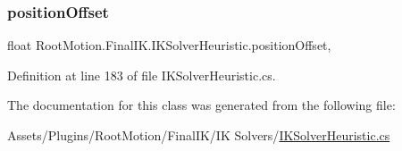 \subsubsection{\texorpdfstring{position\+Offset}{positionOffset}}
{\footnotesize\ttfamily float Root\+Motion.\+Final\+I\+K.\+I\+K\+Solver\+Heuristic.\+position\+Offset\hspace{0.3cm}{\ttfamily [get]}, {\ttfamily [protected]}}



Definition at line 183 of file I\+K\+Solver\+Heuristic.\+cs.



The documentation for this class was generated from the following file\+:\begin{DoxyCompactItemize}
\item 
Assets/\+Plugins/\+Root\+Motion/\+Final\+I\+K/\+I\+K Solvers/\mbox{\hyperlink{_i_k_solver_heuristic_8cs}{I\+K\+Solver\+Heuristic.\+cs}}\end{DoxyCompactItemize}
